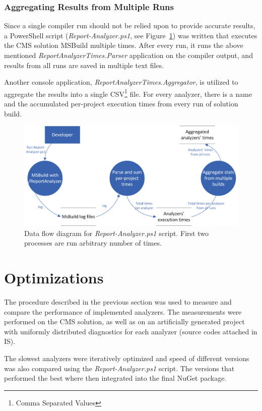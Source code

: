 \documentclass[
  digital, %
  table,   %
  lof,     %
  lot,     %
  oneside,
]{fithesis3}
\begin{document}
\subsubsection{\textbf{Aggregating Results from Multiple Runs}}
Since a single compiler run should not be relied upon to provide accurate results, a PowerShell script (\textit{Report-Analyzer.ps1}, see Figure~\ref{fig:uml-report-analyzer-dfd}) was written that executes the CMS solution MSBuild multiple times. After every run, it runs the above mentioned \textit{ReportAnalyzerTimes.Parser} application on the compiler output, and results from all runs are saved in multiple text files. 

Another console application, \textit{ReportAnalyzerTimes.Aggregator}, is utilized to aggregate the results into a single CSV\footnote{Comma Separated Values} file. For every analyzer, there is a name and the accumulated per-project execution times from every run of solution build.

\begin{figure}[h!]
		\centering
			\includegraphics[scale=0.98]{img/uml/report-analyzer-dfd}
		\caption{Data flow diagram for \textit{Report-Analyzer.ps1} script. First two processes are run arbitrary number of times.}
		\label{fig:uml-report-analyzer-dfd}
\end{figure}

\section{Optimizations}
The procedure described in the previous section was used to measure and compare the performance of implemented analyzers. The measurements were performed on the CMS solution, as well as on an artificially generated project with uniformly distributed diagnostics for each analyzer (source codes attached in IS).

The slowest analyzers were iteratively optimized and speed of different versions was also compared using the \textit{Report-Analyzer.ps1} script. The versions that performed the best where then integrated into the final NuGet package.
\end{document}
